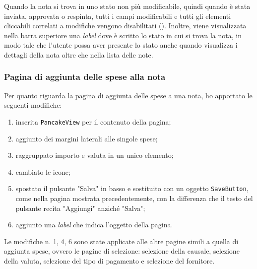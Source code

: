 \noindent Quando la nota si trova in uno stato non più modificabile, quindi quando è stata inviata, approvata o respinta, tutti i campi modificabili e tutti gli elementi cliccabili correlati a modifiche vengono disabilitati (). Inoltre, viene visualizzata nella barra superiore una \textit{label} dove è scritto lo stato in cui si trova la nota, in modo tale che l'utente possa aver presente lo stato anche quando visualizza i dettagli della nota oltre che nella lista delle note.

\clearpage

\subsubsection{Pagina di aggiunta delle spese alla nota}

Per quanto riguarda la pagina di aggiunta delle spese a una nota, ho apportato le seguenti modifiche:
\begin{enumerate}
    \item inserita \texttt{PancakeView} per il contenuto della pagina;
    \item aggiunto dei margini laterali alle singole spese;
    \item raggruppato importo e valuta in un unico elemento;
    \item cambiato le icone;
    \item spostato il pulsante "Salva" in basso e sostituito con un oggetto \texttt{SaveButton}, come nella pagina mostrata precedentemente, con la differenza che il testo del pulsante recita "Aggiungi" anziché "Salva";
    \item aggiunto una \textit{label} che indica l'oggetto della pagina.
\end{enumerate}

\noindent Le modifiche n. 1, 4, 6 sono state applicate alle altre pagine simili a quella di aggiunta spese, ovvero le pagine di selezione: selezione della causale, selezione della valuta, selezione del tipo di pagamento e selezione del fornitore.



